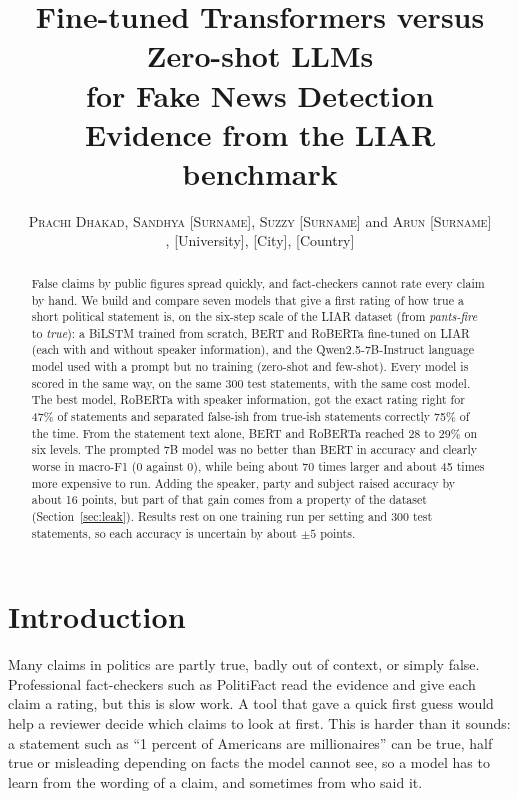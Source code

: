 \documentclass{nle}
\title[Fake news detection on LIAR]
      {Fine-tuned Transformers versus Zero-shot LLMs\\
       for Fake News Detection\\
       \normalsize Evidence from the LIAR benchmark}
\author[Prachi Dhakad and others]
       {\textsc{Prachi Dhakad}, \textsc{Sandhya [Surname]},
        \textsc{Suzzy [Surname]} and \textsc{Arun [Surname]}\\
        [Department], [University], [City], [Country]}
\begin{document}
\label{firstpage}
\maketitle

\begin{abstract}
False claims by public figures spread quickly, and fact-checkers cannot rate every claim by hand. We
build and compare seven models that give a first rating of how true a short political statement is, on
the six-step scale of the LIAR dataset (from \emph{pants-fire} to \emph{true}): a BiLSTM trained from
scratch, BERT and RoBERTa fine-tuned on LIAR (each with and without speaker information), and the
Qwen2.5-7B-Instruct language model used with a prompt but no training (zero-shot and few-shot). Every
model is scored in the same way, on the same 300 test statements, with the same cost model. The best model,
RoBERTa with speaker information, got the exact rating right for 47\% of statements and
separated false-ish from true-ish statements correctly 75\% of the time. From the statement text alone,
BERT and RoBERTa reached 28 to 29\% on six levels. The prompted 7B model was no better than BERT in
accuracy and clearly worse in macro-F1 (0 against 0), while being about 70 times larger and about
45 times more expensive to run. Adding the speaker, party and subject raised accuracy by about 16 points,
but part of that gain comes from a property of the dataset (Section~\ref{sec:leak}). Results rest on one
training run per setting and 300 test statements, so each accuracy is uncertain by about $\pm 5$ points.
\end{abstract}

\section{Introduction}

Many claims in politics are partly true, badly out of context, or simply false. Professional
fact-checkers such as PolitiFact read the evidence and give each claim a rating, but this is slow work. A
tool that gave a quick first guess would help a reviewer decide which claims to look at first. This is
harder than it sounds: a statement such as ``1 percent of Americans are millionaires'' can be true, half
true or misleading depending on facts the model cannot see, so a model has to learn from the wording of a
claim, and sometimes from who said it.
\end{document}
